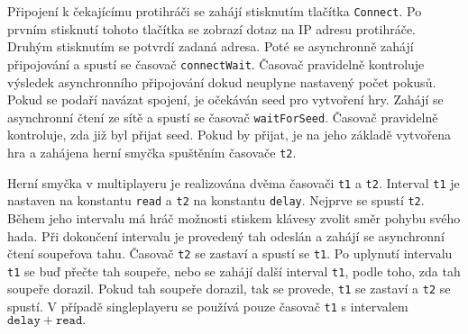 \documentclass[12pt]{article}
\begin{document}
 Připojení k čekajícímu protihráči se zahájí stisknutím tlačítka \texttt{Connect}. Po prvním stisknutí tohoto tlačítka se zobrazí dotaz na IP adresu protihráče. Druhým stisknutím se potvrdí zadaná adresa. Poté se asynchronně zahájí připojování a spustí se časovač \texttt{connectWait}. Časovač pravidelně kontroluje výsledek asynchronního připojování dokud neuplyne nastavený počet pokusů. Pokud se podaří navázat spojení, je očekáván seed pro vytvoření hry. Zahájí se asynchronní čtení ze sítě a spustí se časovač \texttt{waitForSeed}. Časovač pravidelně kontroluje, zda již byl přijat seed. Pokud by přijat, je na jeho základě vytvořena hra a zahájena herní smyčka spuštěním časovače \texttt{t2}.
 
 Herní smyčka v multiplayeru je realizována dvěma časovači \texttt{t1} a \texttt{t2}. Interval \texttt{t1} je nastaven na konstantu \texttt{read} a \texttt{t2} na konstantu \texttt{delay}. Nejprve se spustí \texttt{t2}. Během jeho intervalu má hráč možnosti stiskem klávesy zvolit směr pohybu svého hada. Při dokončení intervalu je provedený tah odeslán a zahájí se asynchronní čtení soupeřova tahu. Časovač \texttt{t2} se zastaví a spustí se \texttt{t1}. Po uplynutí intervalu \texttt{t1} se buď přečte tah soupeře, nebo se zahájí další interval \texttt{t1}, podle toho, zda tah soupeře dorazil. Pokud tah soupeře dorazil, tak se provede, \texttt{t1} se zastaví a \texttt{t2} se spustí. V případě singleplayeru se používá pouze časovač \texttt{t1} s intervalem $\texttt{delay} + \texttt{read}.$
 
 
\end{document}
